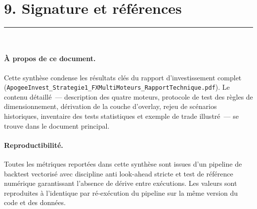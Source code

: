 \documentclass[11pt, a4paper]{scrartcl}
\begin{document}
\section*{9. Signature et références}
\vspace{-0.4em}
{\color{accent}\rule{\linewidth}{1.0pt}}\\[0.4em]

\paragraph{À propos de ce document.} Cette synthèse condense les résultats clés du
rapport d'investissement complet (\texttt{ApogeeInvest\_Strategie1\_FXMultiMoteurs\_RapportTechnique.pdf}). Le contenu détaillé~---
description des quatre moteurs, protocole de test des règles de dimensionnement,
dérivation de la couche d'overlay, rejeu de scénarios historiques, inventaire des
tests statistiques et exemple de trade illustré~--- se trouve dans le document
principal.

\paragraph{Reproductibilité.} Toutes les métriques reportées dans cette synthèse sont
issues d'un pipeline de backtest vectorisé avec discipline anti look-ahead stricte et
test de référence numérique garantissant l'absence de dérive entre exécutions. Les
valeurs sont reproduites à l'identique par ré-exécution du pipeline sur la même
version du code et des données.

\vfill

\noindent\colorbox{softBlue}{%
}

\vspace{0.6cm}
\end{document}
